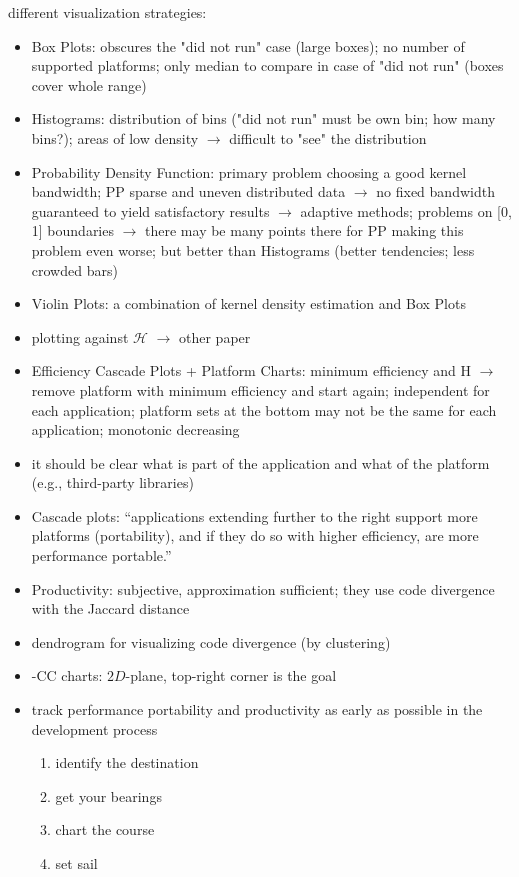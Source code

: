 \newpage
\citet{sewall_interpreting_2020} 
different visualization strategies:
\begin{itemize}
    \item Box Plots: obscures the "did not run" case (large boxes); no number of supported platforms; only median to compare in case of "did not run" (boxes cover whole range)
    \item Histograms: distribution of bins ("did not run" must be own bin; how many bins?); areas of low density $\rightarrow$ difficult to "see" the distribution
    \item Probability Density Function: primary problem choosing a good kernel bandwidth; PP sparse and uneven distributed data $\rightarrow$ no fixed bandwidth guaranteed to yield satisfactory results $\rightarrow$ adaptive methods; problems on [0, 1] boundaries $\rightarrow$ there may be many points there for PP making this problem even worse; but better than Histograms (better tendencies; less crowded bars)
    \item Violin Plots: a combination of kernel density estimation and Box Plots

    \item plotting \pp against $\mathcal{H}$ $\rightarrow$ other paper \cite{deakin_performance_2019}
    \item Efficiency Cascade Plots + Platform Charts: minimum efficiency and H $\rightarrow$ remove platform with minimum efficiency and start again; independent for each application; platform sets at the bottom may not be the same for each application; monotonic decreasing
\end{itemize}




\newpage
\cite{pennycook_navigating_2021}

\begin{itemize}
    \item it should be clear what is part of the application and what of the platform (e.g., third-party libraries)
    \item Cascade plots: \enquote{applications extending further to the right support more platforms (portability), and if they do so with higher efficiency, are more performance portable.}
    \item Productivity: subjective, approximation sufficient; they use \cite{harrell_effective_2018} code divergence with the Jaccard distance
    \item dendrogram for visualizing code divergence (by clustering)
    \item \pp-CC charts: $2D$-plane, top-right corner is the goal
    \item track performance portability and productivity as early as possible in the development process
    \begin{enumerate}
        \item identify the destination
        \item get your bearings
        \item chart the course
        \item set sail
    \end{enumerate}
\end{itemize}

